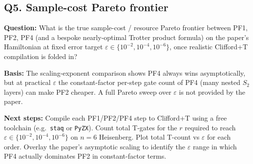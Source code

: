 \subsection*{Q5. Sample-cost Pareto frontier}
\textbf{Question:} What is the true sample-cost / resource Pareto
frontier between PF1, PF2, PF4 (and a bespoke nearly-optimal Trotter
product formula) on the paper's Hamiltonian at fixed error target
$\varepsilon\in\{10^{-2},10^{-4},10^{-6}\}$, once realistic Clifford+T
compilation is folded in?

\textbf{Basis:} The scaling-exponent comparison shows PF4 always wins
asymptotically, but at practical $\varepsilon$ the constant-factor
per-step gate count of PF4 (many nested $S_2$ layers) can make PF2
cheaper. A full Pareto sweep over $\varepsilon$ is not provided by the
paper.

\textbf{Next steps:} Compile each PF1/PF2/PF4 step to Clifford+T using a
free toolchain (e.g.\ \texttt{staq} or \texttt{PyZX}). Count total
T-gates for the $r$ required to reach $\varepsilon\in\{10^{-2},10^{-4},10^{-6}\}$
on $n=6$ Heisenberg. Plot total T-count vs $\varepsilon$ for each order.
Overlay the paper's asymptotic scaling to identify the $\varepsilon$
range in which PF4 actually dominates PF2 in constant-factor terms.
